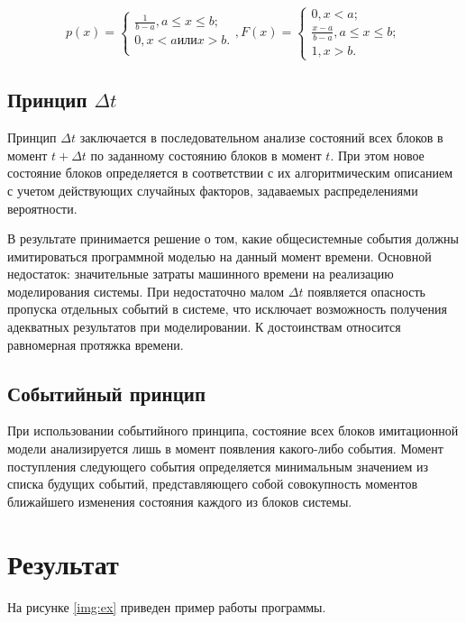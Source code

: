 \documentclass[a4paper, 14pt, unknownkeysallowed]{extreport}
\begin{document}
\begin{equation}
	p(x) = \begin{cases}
		\frac{1}{b - a}, a\leq x\leq b;\\
		0, x < a или x > b.\\
	\end{cases},   
	F(x) =  \begin{cases}
		0, x < a;\\
		\frac{x-a}{b-a}, a\leq x\leq b;\\
		1, x > b.
	\end{cases}
\end{equation}


\section{Принцип $\Delta t$}

Принцип $\Delta t$ заключается в последовательном анализе состояний всех блоков 
в момент $t + \Delta t$ по заданному состоянию блоков в момент $t$. 
При этом новое состояние блоков определяется в соответствии с их алгоритмическим 
описанием с учетом действующих случайных факторов, задаваемых распределениями 
вероятности. 

В результате принимается решение о том, какие общесистемные события 
должны имитироваться программной моделью на данный момент времени. 
Основной недостаток: значительные затраты машинного времени на реализацию 
моделирования системы. При недостаточно малом $\Delta t$ появляется опасность 
пропуска отдельных событий в системе, что исключает возможность получения 
адекватных результатов при моделировании. 
К достоинствам относится равномерная протяжка времени.

\section{Событийный принцип}

При использовании событийного принципа, 
состояние всех блоков имитационной модели анализируется лишь 
в момент появления какого-либо события. Момент поступления 
следующего события определяется минимальным значением из списка будущих событий, 
представляющего собой совокупность моментов ближайшего изменения состояния 
каждого из блоков системы.

\chapter{Результат}
На рисунке \ref{img:ex} приведен пример работы программы.
\end{document}
